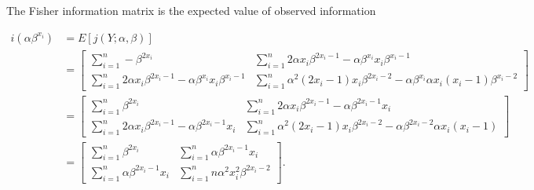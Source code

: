 The Fisher information matrix is the expected value of observed information

\begin{align*}
    i\left(\alpha \beta^{x_i} \right) &= E\left[j(Y;\alpha ,\beta)\right]\\
    &= \begin{bmatrix} 
    \sum_{i = 1}^n - \beta^{2x_i} 
    &
    \sum_{i = 1}^n 2\alpha x_i \beta^{2x_i - 1} - \alpha\beta^{x_i}x_i\beta^{x_i - 1}
    \\
    \sum_{i = 1}^n 2\alpha x_i \beta^{2x_i - 1} - \alpha\beta^{x_i}x_i\beta^{x_i - 1}
    &
    \sum_{i = 1}^n \alpha^2(2x_i - 1)x_i\beta^{2x_i - 2} - \alpha \beta^{x_i} \alpha x_i(x_i - 1) \beta^{x_i - 2}
    \end{bmatrix} \\
    &= \begin{bmatrix} 
    \sum_{i = 1}^n \beta^{2x_i}  
    &
     \sum_{i = 1}^n 2\alpha x_i \beta^{2x_i - 1} - \alpha\beta^{2x_i-1}x_i
    \\
    \sum_{i = 1}^n 2\alpha x_i \beta^{2x_i - 1} - \alpha\beta^{2x_i-1}x_i
    &
    \sum_{i = 1}^n \alpha^2(2x_i - 1)x_i\beta^{2x_i - 2} - \alpha \beta^{2x_i - 2} \alpha x_i(x_i - 1)
    \end{bmatrix}\\
    &= \begin{bmatrix} 
    \sum_{i = 1}^n \beta^{2x_i}  
    &
     \sum_{i = 1}^n  \alpha\beta^{2x_i-1}x_i
    \\
    \sum_{i = 1}^n  \alpha\beta^{2x_i-1}x_i
    &
    \sum_{i = 1}^n n\alpha^2 x_i^2 \beta^{2x_i - 2}
    \end{bmatrix}.  
\end{align*}

